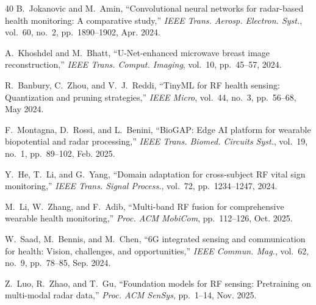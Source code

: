 \documentclass[journal,twoside]{IEEEtran}
\begin{document}
\begin{thebibliography}{40}
B.~Jokanovic and M.~Amin, ``Convolutional neural networks for radar-based health monitoring: A comparative study,'' \textit{IEEE Trans. Aerosp. Electron. Syst.}, vol.~60, no.~2, pp.~1890--1902, Apr. 2024.

A.~Khoshdel and M.~Bhatt, ``U-Net-enhanced microwave breast image reconstruction,'' \textit{IEEE Trans. Comput. Imaging}, vol.~10, pp.~45--57, 2024.

R.~Banbury, C.~Zhou, and V.~J.~Reddi, ``TinyML for RF health sensing: Quantization and pruning strategies,'' \textit{IEEE Micro}, vol.~44, no.~3, pp.~56--68, May 2024.

F.~Montagna, D.~Rossi, and L.~Benini, ``BioGAP: Edge AI platform for wearable biopotential and radar processing,'' \textit{IEEE Trans. Biomed. Circuits Syst.}, vol.~19, no.~1, pp.~89--102, Feb. 2025.

Y.~He, T.~Li, and G.~Yang, ``Domain adaptation for cross-subject RF vital sign monitoring,'' \textit{IEEE Trans. Signal Process.}, vol.~72, pp.~1234--1247, 2024.

M.~Li, W.~Zhang, and F.~Adib, ``Multi-band RF fusion for comprehensive wearable health monitoring,'' \textit{Proc. ACM MobiCom}, pp.~112--126, Oct. 2025.

W.~Saad, M.~Bennis, and M.~Chen, ``6G integrated sensing and communication for health: Vision, challenges, and opportunities,'' \textit{IEEE Commun. Mag.}, vol.~62, no.~9, pp.~78--85, Sep. 2024.

Z.~Luo, R.~Zhao, and T.~Gu, ``Foundation models for RF sensing: Pretraining on multi-modal radar data,'' \textit{Proc. ACM SenSys}, pp.~1--14, Nov. 2025.

\end{thebibliography}

\balance
\end{document}
